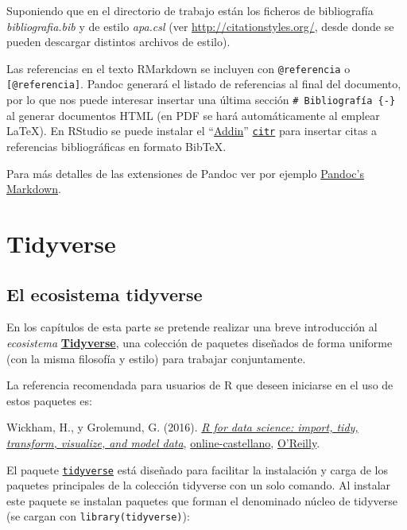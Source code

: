 \documentclass[
]{book}
\theoremstyle{break}
\theoremstyle{nonumberplain}
\begin{document}
Suponiendo que en el directorio de trabajo están los ficheros de bibliografía \emph{bibliografia.bib}
y de estilo \emph{apa.csl} (ver \url{http://citationstyles.org/}, desde donde se pueden descargar
distintos archivos de estilo).

Las referencias en el texto RMarkdown se incluyen con \texttt{@referencia} o \texttt{{[}@referencia{]}}.
Pandoc generará el listado de referencias al final del documento,
por lo que nos puede interesar insertar una última sección \texttt{\#\ Bibliografía\ \{-\}}
al generar documentos HTML (en PDF se hará automáticamente al emplear LaTeX).
En RStudio se puede instalar el ``\href{https://rstudio.github.io/rstudioaddins/}{Addin}''
\href{https://github.com/crsh/citr}{\texttt{citr}} para insertar
citas a referencias bibliográficas en formato BibTeX.

Para más detalles de las extensiones de Pandoc ver por ejemplo \href{https://pandoc.org/MANUAL.html\#pandocs-markdown}{Pandoc's Markdown}.

\hypertarget{part-tidyverse}{%
\part{Tidyverse}\label{part-tidyverse}}

\hypertarget{tidyverse}{%
\chapter{El ecosistema tidyverse}\label{tidyverse}}

En los capítulos de esta parte se pretende realizar una breve introducción al \emph{ecosistema} \href{https://dplyr.tidyverse.org}{\textbf{Tidyverse}}, una colección de paquetes diseñados de forma uniforme (con la misma filosofía y estilo) para trabajar conjuntamente.

La referencia recomendada para usuarios de R que deseen iniciarse en el uso de estos paquetes es:

Wickham, H., y Grolemund, G. (2016). \emph{\href{http://r4ds.had.co.nz}{R for data science: import, tidy, transform, visualize, and model data}}, \href{https://es.r4ds.hadley.nz}{online-castellano}, \href{http://shop.oreilly.com/product/0636920034407.do}{O'Reilly}.

El paquete \href{https://tidyverse.tidyverse.org}{\texttt{tidyverse}} está diseñado para facilitar la instalación y carga de los paquetes principales de la colección tidyverse con un solo comando.
Al instalar este paquete se instalan paquetes que forman el denominado núcleo de tidyverse (se cargan con \texttt{library(tidyverse)}):
\end{document}
